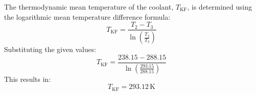 The thermodynamic mean temperature of the coolant, \( T_{\text{KF}} \), is determined using the logarithmic mean temperature difference formula:  
\[
T_{\text{KF}} = \frac{T_2 - T_3}{\ln \left( \frac{T_2}{T_3} \right)}
\]  
Substituting the given values:  
\[
T_{\text{KF}} = \frac{238.15 - 288.15}{\ln \left( \frac{293.15}{288.15} \right)}
\]  
This results in:  
\[
T_{\text{KF}} = 293.12 \, \text{K}
\]